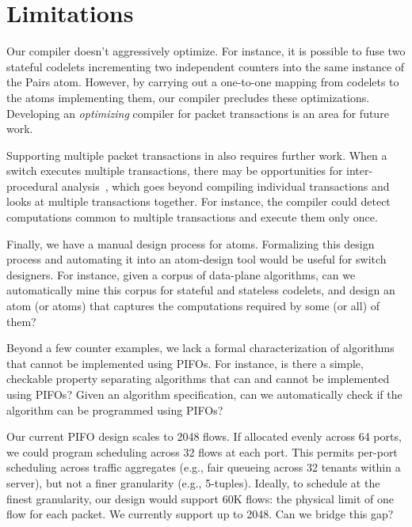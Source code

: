 \chapter{Limitations}
\label{chap:limitations}

%
%
\begin{CompactEnumerate}
\item Our compiler doesn't aggressively optimize. For instance, it is possible
to fuse two stateful codelets incrementing two independent counters into the
same instance of the Pairs atom. However, by carrying out a one-to-one mapping
from codelets to the atoms implementing them, our compiler precludes these
optimizations.  Developing an {\em optimizing} compiler for packet transactions
is an area for future work.

\item Supporting multiple packet transactions in \pktlanguage also requires
further work. When a switch executes multiple transactions, there may be
opportunities for inter-procedural analysis~\cite{dragonbook}, which goes
beyond compiling individual transactions and looks at multiple transactions
together.  For instance, the compiler could detect computations common to
multiple transactions and execute them only once.

\item Finally, we have a manual design process for atoms.  Formalizing this
design process and automating it into an atom-design tool would be useful for
switch designers. For instance, given a corpus of data-plane algorithms, can we
automatically mine this corpus for stateful and stateless codelets, and design
an atom (or atoms) that captures the computations required by some (or all) of
them?

\item Beyond a few counter examples, we lack a formal characterization of
algorithms that cannot be implemented using PIFOs. For instance, is there a
simple, checkable property separating algorithms that can and cannot be
implemented using PIFOs? Given an algorithm specification, can we
automatically check if the algorithm can be programmed
using PIFOs?

\item Our current PIFO design scales to 2048 flows. If allocated evenly across
64 ports, we could program scheduling across 32 flows at each port. This
permits per-port scheduling across traffic aggregates (e.g., fair queueing
across 32 tenants within a server), but not a finer granularity (e.g.,
5-tuples). Ideally, to schedule at the finest granularity, our design would
support 60K flows: the physical limit of one flow for each packet. We currently
support up to 2048. Can we bridge this gap?
\end{CompactEnumerate}
